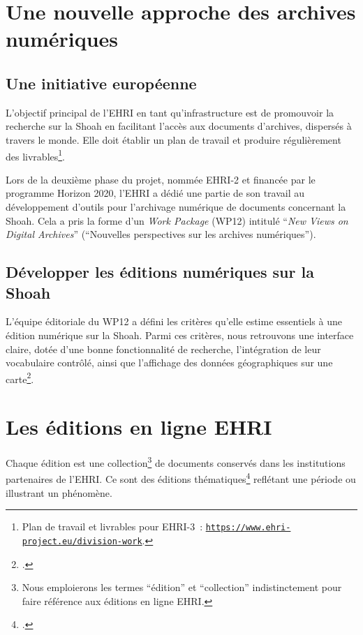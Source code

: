 
\section{Une nouvelle approche des archives numériques}

\subsection{Une initiative européenne}
L'objectif principal de l'EHRI en tant qu'infrastructure est de promouvoir la recherche sur la Shoah en facilitant l'accès aux documents d'archives, dispersés à travers le monde. Elle doit établir un plan de travail et produire régulièrement des livrables\footnote{Plan de travail et livrables pour EHRI-3~: \texttt{\href{https://www.ehri-project.eu/division-work}{https://www.ehri-project.eu/division-work}}.}.  

Lors de la deuxième phase du projet, nommée EHRI-2 et financée par le programme Horizon 2020, l'EHRI a dédié une partie de son travail au développement d'outils pour l'archivage numérique de documents concernant la Shoah. Cela a pris la forme d'un \textit{Work Package} (WP12) intitulé \enquote{\textit{New Views on Digital Archives}} (\enquote{Nouvelles perspectives sur les archives numériques}). 


\subsection{Développer les éditions numériques sur la Shoah}
L'équipe éditoriale du WP12 a défini les critères qu'elle estime essentiels à une édition numérique sur la Shoah. Parmi ces critères, nous retrouvons une interface claire, dotée d'une bonne fonctionnalité de recherche, l'intégration de leur vocabulaire contrôlé, ainsi que l'affichage des données géographiques sur une carte\footcite[p.~6]{Ehri2018}.  



\section{Les éditions en ligne EHRI}
Chaque édition est une collection\footnote{Nous emploierons les termes \enquote{édition} et \enquote{collection} indistinctement pour faire référence aux éditions en ligne EHRI.} de documents conservés dans les institutions partenaires de l'EHRI. Ce sont des éditions thématiques\footcite{EhriOnlineEditions} reflétant une période ou illustrant un phénomène.



